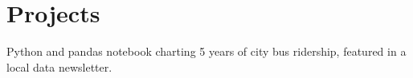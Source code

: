 \documentclass[]{deedy-resume-openfont}
\begin{document}
\begin{minipage}[t]{0.66\textwidth}
\section{Projects}
\begin{tightemize}
\item Python and pandas notebook charting 5 years of city bus ridership, featured in a local data newsletter. %
\end{tightemize}
\sectionsep

\end{minipage}
\end{document}
